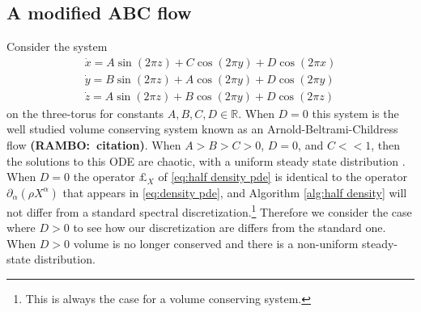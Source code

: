 \documentclass[final,leqno]{siamltex1213}
\newcommand{\ram}[1]{{\normalsize{\textbf{({\color{red}RAMBO:\ }#1)}}}}
\begin{document}
%
%


\subsection{A modified ABC flow}
\label{sec:ABC_flow}

Consider the system
\begin{align}
	\dot{x} = A \sin( 2\pi z) + C \cos(2\pi y)  + D \cos(2\pi x)\\
	\dot{y} = B \sin( 2\pi z) + A \cos(2\pi y)  + D \cos(2\pi y)\\
	\dot{z} = A \sin( 2\pi z) + B \cos(2\pi y)  + D \cos(2\pi z)
\end{align}
on the three-torus for constants $A,B,C,D \in \mathbb{R}$.  
When $D=0$ this system is the well studied volume conserving system known as an Arnold-Beltrami-Childress flow \ram{citation}.
When $A > B > C > 0$, $D=0$, and $C << 1$, then the solutions to this ODE are chaotic, with a uniform steady state distribution \cite{MajdaBertozzi2002}.
When $D=0$ the operator $\pounds_{X}$ of \eqref{eq:half density pde} is identical to the operator $\partial_{\alpha}( \rho X^{\alpha})$ that appears in \eqref{eq:density pde}, and Algorithm \ref{alg:half density} will not differ from a standard spectral discretization.\footnote{This is always the case for a volume conserving system.}
Therefore we consider the case where $D > 0$ to see how our discretization are differs from the standard one.
When $D> 0$ volume is no longer conserved and there is a non-uniform steady-state distribution.
\end{document}
